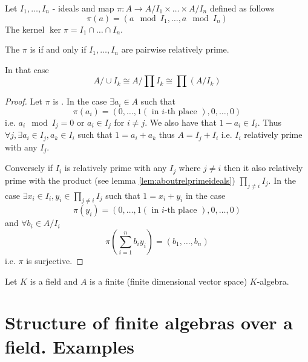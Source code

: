 \begin{theorem}
  Let $I_1, \dots, I_n$ - ideals and map
  $\pi: A \to A/I_1 \times \dots \times A/I_n$ defined as follows
  \[
  \pi(a) = \left(a \mod I_1, \dots, a \mod I_n\right)
  \]
  The kernel $\ker \pi = I_1 \cap \dots \cap I_n$.

  The $\pi$ is  if and only if $I_1, \dots,
  I_n$ are pairwise relatively prime.

  In that case
  \[
  A/\cup I_k
  \cong
  A/\prod I_k
  \cong
  \prod \left(A/I_k\right)
  \]
  \begin{proof}
    Let $\pi$ is . In the case
    $\exists a_i \in A$ such that
    \[
    \pi(a_i) = \left(0, \dots, 1 (\mbox{ in }i\mbox{-th place }),
    0, \dots, 0\right)
    \]
    i.e.
    $a_i \mod I_j = 0$ or $a_i \in I_j$ for $i \ne j$. We also have
    that $1 - a_i \in I_i$.
    Thus $\forall j, \exists a_i \in I_j, a_k \in I_i$ such that
    $1 = a_i + a_k$ thus $A = I_j + I_i$ i.e. $I_i$ relatively prime
    with any $I_j$.

    Conversely if $I_i$ is relatively prime with any $I_j$ where $j
    \ne i$ then it also relatively prime with the product (see lemma
    \ref{lem:aboutrelprimeideals}) $\prod_{j \ne i} I_j$. In the case
    $\exists x_i \in I_i, y_i \in \prod_{j \ne i} I_j$ such that
    $1 = x_i + y_i$ in the case
    \[
    \pi(y_i) = \left(0, \dots, 1 (\mbox{ in }i\mbox{-th place }),
    0, \dots, 0\right)
    \]
    and $\forall b_i \in A/I_i$
    \[
    \pi \left(\sum_{i = 1}^n b_i y_i\right) =
    \left(b_1, \dots, b_n\right)
    \]
    i.e. $\pi$ is surjective.
  \end{proof}
  \label{thm:chineseremainder}
\end{theorem}

Let $K$ is a field and $A$ is a finite (finite dimensional vector
space) $K$-algebra.

\section{Structure of finite algebras over a field. Examples}
